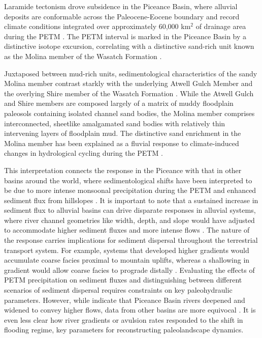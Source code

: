 \documentclass[draft]{compact_proposal}\usepackage[]{graphicx}\usepackage[]{color}
\newcommand{\del}[3]{\ce{\delta^#1#2_{#3}}}
\begin{document}
Laramide tectonism drove subsidence in the Piceance Basin, where alluvial deposits are conformable across the Paleocene-Eocene boundary and record climate conditions integrated over approximately 60,000 km$^2$ of drainage area during the PETM \parencite{johnson_history_2003}.
The PETM interval is marked in the Piceance Basin by a distinctive \del{13}{C}{} isotope excursion, correlating with a distinctive sand-rich unit known as the Molina member of the Wasatch Formation \parencite{foreman_fluvial_2012}.

Juxtaposed between mud-rich units, sedimentological characteristics of the sandy Molina member contrast starkly with the underlying Atwell Gulch Member and the overlying Shire member of the Wasatch Formation \parencite{donnell_paleocene_1969}.
While the Atwell Gulch and Shire members are composed largely of a matrix of muddy floodplain paleosols containing isolated channel sand bodies, the Molina member comprises interconnected, sheetlike amalgamated sand bodies with relatively thin intervening layers of floodplain mud.
The distinctive sand enrichment in the Molina member has been explained as a fluvial response to climate-induced changes in hydrological cycling during the PETM \parencite{foreman_fluvial_2012}.

This interpretation connects the response in the Piceance with that in other basins around the world, where sedimentological shifts have been interpreted to be due to more intense monsoonal precipitation during the PETM and enhanced sediment flux from hillslopes \parencite{pujalte_massive_2015, schmitz_abrupt_2007, foreman_fluvial_2012, foreman_climate-driven_2014}.
It is important to note that a sustained increase in sediment flux to alluvial basins can drive disparate responses in alluvial systems, where river channel geometries like width, depth, and slope would have adjusted to accommodate higher sediment fluxes and more intense flows \parencite[][and others]{strong_mass-balance_2005, bryant_experimental_1995}.
The nature of the response carries implications for sediment dispersal throughout the terrestrial transport system.
For example, systems that developed higher gradients would accumulate coarse facies proximal to mountain uplifts, whereas a shallowing in gradient would allow coarse facies to prograde distally \parencite{heller_downstream_1996, armitage_transformation_2011}.
Evaluating the effects of PETM precipitation on sediment fluxes and distinguishing between different scenarios of sediment dispersal requires constraints on key paleohydraulic parameters.
However, while \textcite{foreman_fluvial_2012} indicate that Piceance Basin rivers deepened and widened to convey higher flows, data from other basins are more equivocal \parencite{chen_estimating_2018}. 
It is even less clear how river gradients or avulsion rates responded to the shift in flooding regime, key parameters for reconstructing paleolandscape dynamics.
\end{document}
